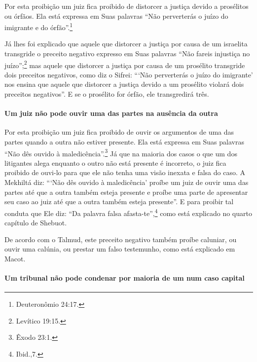Por esta proibição um juiz fica proibido de distorcer a justiça devido
a prosélitos ou órfãos. Ela está expressa em Suas palavras ``Não
perverterás o juízo do imigrante e do órfão''.\footnote{Deuteronômio 24:17.}

Já lhes foi explicado que aquele que distorcer a justiça por causa de um
israelita transgride o preceito negativo expresso em Suas palavras ``Não
fareis injustiça no juízo'';\footnote{Levítico 19:15.} mas aquele que distorcer
a justiça por causa de um prosélito transgride dois preceitos negativos,
como diz o Sifrei: ```Não perverterás o juízo do imigrante' nos ensina
que aquele que distorcer a justiça devido a um prosélito violará dois
preceitos negativos''. E se o prosélito for órfão, ele transgredirá
três.

\paragraph{Um juiz não pode ouvir uma das partes na ausência da outra}

Por esta proibição um juiz fica proibido de ouvir os argumentos de uma
das partes quando a outra não estiver presente. Ela está expressa em
Suas palavras ``Não dês ouvido à maledicência''.\footnote{Êxodo 23:1.} Já que na
maioria dos casos o que um dos litigantes alega enquanto o outro não
está presente é incorreto, o juiz fica proibido de ouvi-lo para que ele
não tenha uma visão inexata e falsa do caso. A Mekhiltá diz: ```Não dês
ouvido à maledicência' proíbe um juiz de ouvir uma das partes até que a
outra também esteja presente e proíbe uma parte de apresentar seu caso
ao juiz até que a outra também esteja presente''. E para proibir tal
conduta que Ele diz: ``Da palavra falsa afasta-te'',\footnote{Ibid.,7.} como está
explicado no quarto capítulo de Shebuot.

De acordo com o Talmud, este preceito negativo também proíbe caluniar,
ou ouvir uma calúnia, ou prestar um falso testemunho, como está
explicado em Macot.

\paragraph{Um tribunal não pode condenar por maioria de um num caso capital}


